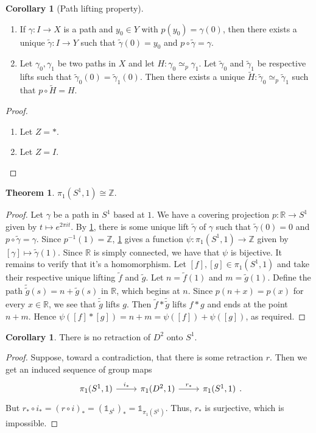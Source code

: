 \documentclass[10pt,letterpaper,cm]{nupset}
\theoremstyle{definition}
\theoremstyle{theorem}
\newtheorem{theorem}[definition]{Theorem}
\newtheorem{corollary}[definition]{Corollary}
\theoremstyle{remark}
\newcommand{\R}{\mathbb{R}}
\newcommand{\Z}{\mathbb Z}
\newcommand{\1}{\mathbb{1}}
\newcommand{\0}{\vec 0}
\begin{document}
\begin{corollary}[Path lifting property]\label{cor1} $ $
\begin{enumerate}
\item If $\gamma : I \to X$ is a path and $y_0 \in Y$ with $p(y_0) = \gamma(0)$, then there exists a unique $\tilde{\gamma} : I \to Y$ such that $\tilde{\gamma}(0) = y_0$ and $p \circ \tilde{\gamma} = \gamma$.
\item Let $\gamma_0, \gamma_1$ be two paths in $X$ and let $H : \gamma_0 \simeq_p \gamma_1$. Let $\tilde{\gamma}_0$ and $\tilde{\gamma}_1$ be respective lifts such that $\tilde{\gamma}_0 (0) = \tilde{\gamma}_1(0)$. Then there exists a unique $\widetilde{H} : \tilde{\gamma}_0 \simeq_p \tilde{\gamma}_1$ such that $p \circ \widetilde{H} = H$.
\end{enumerate}
\end{corollary}
\begin{proof} $ $
\begin{enumerate}
\item Let $Z = \ast$.
\item Let $Z = I$.
\end{enumerate}
\end{proof}

\begin{theorem}
$\pi_1(S^1, 1) \cong \Z$.
\end{theorem}
\begin{proof}
Let $\gamma$ be a path in $S^1$ based at $1$. We have a covering projection $p: \R \to S^1$ given by $t\mapsto e^{2\pi i t}$. By \cref{cor1}, there is some unique lift $\tilde{\gamma}$ of $\gamma$ such that $\tilde{\gamma}(0) = 0$ and $p \circ \tilde{\gamma} = \gamma$. Since $p^{-1}(1) = \Z$, \cref{cor1} gives a function $\psi: \pi_1(S^1, 1) \to \Z$ given by $\left[\gamma \right] \mapsto \tilde{\gamma}(1)$. Since $\R$ is simply connected, we have that $\psi$ is bijective. It remains to verify that it's a homomorphism. Let $[f], [g] \in \pi_1(S^1, 1)$ and take their respective unique lifting $\tilde{f}$ and $\tilde{g}$. Let $n = \tilde{f}(1)$ and $m= \tilde{g}(1)$. Define the path $\tilde{\tilde{g}}(s) = n+ \tilde{g}(s)$ in $\R$, which begins at $n$. Since $p(n+x) = p(x)$ for every $x\in \R$, we see that $\tilde{\tilde{g}}$ lifts $g$. Then $\tilde{f} \ast \tilde{\tilde{g}}$ lifts $f \ast g$ and ends at the point $n+m$. Hence $\psi([f] \ast [g]) = n+m = \psi([f])  + \psi([g])$, as required. 
\end{proof}


\begin{corollary}
There is no retraction of $D^2$ onto $S^1$.
\end{corollary}
\begin{proof}
Suppose, toward a contradiction, that there is some retraction $r$. Then we get an induced sequence of group maps
\[
\begin{tikzcd}
{\pi_1(S^1, 1)} \arrow[r, "i_{\ast}"] & {\pi_1(D^2, 1)} \arrow[r, "r_{\ast}"] & {\pi_1(S^1, 1)}
\end{tikzcd}
.\] But $r_{\ast} \circ i_{\ast} = \left(r \circ i\right)_{\ast} = \left(\1_{S^1}\right)_{\ast} = \1_{\pi_1(S^1)}$. Thus, $r_{\ast}$ is surjective, which is impossible. 
\end{proof}
\end{document}
